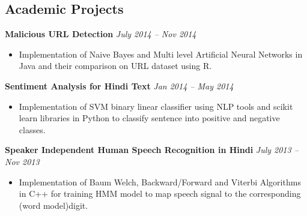 \documentclass[margin,line]{resume}
\begin{document}
\begin{resume}
    \section{\mysidestyle Academic Projects}
    \textbf{Malicious URL Detection} \hfill \textsl{July 2014 -- Nov 2014} \vspace{0mm}\\\vspace{0mm}%
       \begin{itemize}
	        \item Implementation of Naive Bayes and Multi level Artificial Neural Networks in Java and their comparison on URL dataset using R.
       \end{itemize}

    \textbf{Sentiment Analysis for Hindi Text} \hfill \textsl{Jan 2014 -- May 2014} \vspace{0mm}\\\vspace{0mm}%
       \begin{itemize}
            \item Implementation of SVM binary linear classifier using NLP tools and scikit learn libraries in Python to classify sentence into positive and negative classes.
       \end{itemize}


    \textbf{Speaker Independent Human Speech Recognition in Hindi} \hfill \textsl{July 2013 -- Nov 2013} \vspace{0mm}\\\vspace{0mm}%
       \begin{itemize}
            \item Implementation of Baum Welch, Backward/Forward and Viterbi Algorithms in C++ for training HMM model to map speech signal to the corresponding (word model)digit.
       \end{itemize}



\end{resume}
\end{document}

